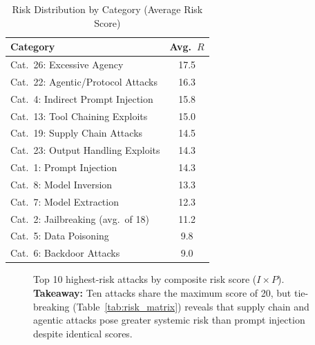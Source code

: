 \documentclass[conference]{IEEEtran}
\newcommand{\tableheaderrow}{\rowcolor{accentblue}}
\renewcommand{\thead}[1]{\textbf{\color{white}\sffamily #1}}
\begin{document}
\begin{table}[!htbp]
\centering
\caption{Risk Distribution by Category (Average Risk Score)}
\label{tab:cat_risk}
\renewcommand{\arraystretch}{1.15}
\scriptsize\sffamily
\begin{tabular}{lc}
\toprule
\tableheaderrow \thead{Category} & \thead{Avg.\ $R$} \\
\toprule
\rowcolor{critred!8} Cat.\ 26: Excessive Agency & 17.5 \\
\rowcolor{critred!8} Cat.\ 22: Agentic/Protocol Attacks & 16.3 \\
\rowcolor{orange!8} Cat.\ 4: Indirect Prompt Injection & 15.8 \\
\rowcolor{orange!8} Cat.\ 13: Tool Chaining Exploits & 15.0 \\
\rowcolor{rowalt} Cat.\ 19: Supply Chain Attacks & 14.5 \\
Cat.\ 23: Output Handling Exploits & 14.3 \\
\rowcolor{rowalt} Cat.\ 1: Prompt Injection & 14.3 \\
Cat.\ 8: Model Inversion & 13.3 \\
\rowcolor{rowalt} Cat.\ 7: Model Extraction & 12.3 \\
Cat.\ 2: Jailbreaking (avg.\ of 18) & 11.2 \\
\rowcolor{rowalt} Cat.\ 5: Data Poisoning & 9.8 \\
Cat.\ 6: Backdoor Attacks & 9.0 \\
\bottomrule
\end{tabular}
\end{table}

\begin{figure}[!htbp]
\centering
{}
\caption{Top 10 highest-risk attacks by composite risk score ($I \times P$). \textbf{Takeaway:} Ten attacks share the maximum score of 20, but tie-breaking (Table~\ref{tab:risk_matrix}) reveals that supply chain and agentic attacks pose greater systemic risk than prompt injection despite identical scores.}
\label{fig:top10_bar}
\end{figure}
\end{document}

